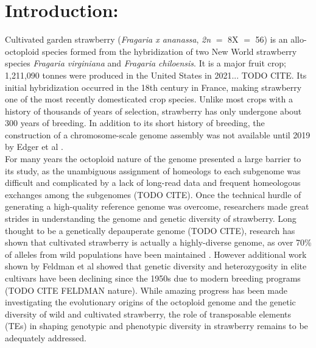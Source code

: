 \documentclass[fleqn,10pt]{olplainarticle}
\begin{document}
\flushbottom
\maketitle
\thispagestyle{empty}

\newpage


\section{Introduction:}
Cultivated garden strawberry (\textit{Fragaria x ananassa}, \textit{2n} $=$ 8X $=$ 56) is an allo-octoploid species formed from the hybridization of two New World strawberry species \textit{Fragaria virginiana} and \textit{Fragaria chiloensis}.
It is a major fruit crop; 1,211,090 tonnes were produced in the United States in 2021... TODO CITE.
Its initial hybridization occurred in the 18th century in France, making strawberry one of the most recently domesticated crop species.
Unlike most crops with a history of thousands of years of selection, strawberry has only undergone about 300 years of breeding.
In addition to its short history of breeding, the construction of a chromosome-scale genome assembly was not available until 2019 by Edger et al \cite{Edger2019}. \\

For many years the octoploid nature of the genome presented a large barrier to its study, as the unambiguous assignment of homeologs to each subgenome was difficult and complicated by a lack of long-read data and frequent homeologous exchanges among the subgenomes (TODO CITE).
Once the technical hurdle of generating a high-quality reference genome was overcome, researchers made great strides in understanding the genome and genetic diversity of strawberry.
Long thought to be a genetically depauperate genome (TODO CITE), research has shown that cultivated strawberry is actually a highly-diverse genome, as over 70\% of alleles from wild populations have been maintained \cite{Hardigan2020,Hardigan2021}.
However additional work shown by Feldman et al showed that genetic diversity and heterozygosity in elite cultivars have been declining since the 1950s due to modern breeding programs (TODO CITE FELDMAN nature).
While amazing progress has been made investigating the evolutionary origins of the octoploid genome and the genetic diversity of wild and cultivated strawberry, the role of transposable elements (TEs) in shaping genotypic and phenotypic diversity in strawberry remains to be adequately addressed. \\
\end{document}
